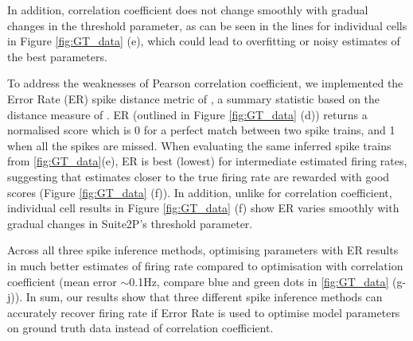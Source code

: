 \documentclass[a4paper,10pt,twocolumn]{article}
\begin{document}
In addition, correlation coefficient does not change smoothly with gradual changes in the threshold parameter, as can be seen in the lines for individual cells in Figure \ref{fig:GT_data} (e), which could lead to overfitting or noisy estimates of the best parameters. 

To address the weaknesses of Pearson correlation coefficient, we implemented the Error Rate (ER) spike distance metric of \citet{Deneux2016-gu}, a summary statistic based on the distance measure of \cite{Victor1996-cg}. ER (outlined in Figure \ref{fig:GT_data} (d)) returns a normalised score which is 0 for a perfect match between two spike trains, and 1 when all the spikes are missed. When evaluating the same inferred spike trains from \ref{fig:GT_data}(e), ER is best (lowest) for intermediate estimated firing rates, suggesting that estimates closer to the true firing rate are rewarded with good scores (Figure \ref{fig:GT_data} (f)). In addition, unlike for correlation coefficient, individual cell results in Figure \ref{fig:GT_data} (f) show ER varies smoothly with gradual changes in Suite2P's threshold parameter. 


Across all three spike inference methods, optimising parameters with ER results in much better estimates of firing rate compared to optimisation with correlation coefficient  (mean error $\sim$0.1Hz, compare blue and green dots in \ref{fig:GT_data} (g-j)). 
In sum, our results show that three different spike inference methods can accurately recover firing rate if Error Rate is used to optimise model parameters on ground truth data instead of correlation coefficient. \\

\end{document}
